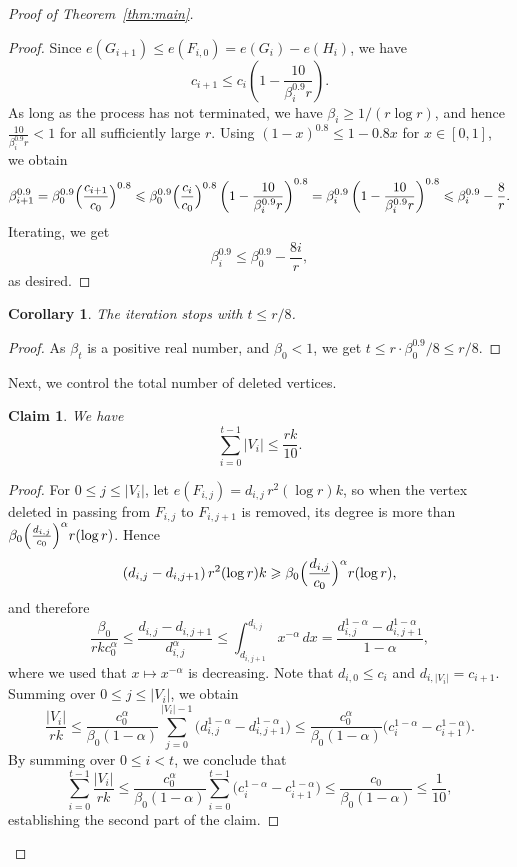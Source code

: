 \documentclass[12pt,reqno]{amsart}
\newtheorem{claim}[theorem]{Claim}
\newtheorem{corollary}[theorem]{Corollary}
\theoremstyle{remark}
\numberwithin{theorem}{section}
\renewcommand{\(}{\bigl(}
\renewcommand{\)}{\bigr)\vphantom{)}}
\renewcommand{\leq}{\le}
\renewcommand{\geq}{\ge}
\renewcommand{\le}{\leqslant}
\renewcommand{\ge}{\geqslant}
\begin{document}
\begin{proof}[Proof of Theorem~\ref{thm:main}]
\begin{proof}
    Since $e(G_{i+1})\leq e(F_{i,0})=e(G_i)-e(H_i)$, we have
\[c_{i+1}\leq c_i\left(1-\frac{10}{\beta_i^{0.9}r}\right).\]
As long as the process has not terminated, we have $\beta_i\geq 1/(r\log r)$, and hence $\frac{10}{\beta_i^{0.9}r} <1$ for all sufficiently large $r$. Using $(1-x)^{0.8}\leq 1-0.8x$ for $x\in[0,1]$, we obtain
\[\beta_{i+1}^{0.9}=
\beta_0^{0.9}\Bigl(\frac{c_{i+1}}{c_0}\Bigr)^{0.8} \leq
\beta_0^{0.9}\Bigl(\frac{c_i}{c_0}\Bigr)^{0.8}
\left(1-\frac{10}{\beta_i^{0.9}r}\right)^{0.8} =
\beta_i^{0.9}\left(1-\frac{10}{\beta_i^{0.9}r}\right)^{0.8}\leq
\beta_i^{0.9}-\frac{8}{r}.\]
Iterating, we get
\[\beta_i^{0.9}\leq \beta_0^{0.9}-\frac{8 i}{r},\]
as desired.
\end{proof}

\begin{corollary}
    The iteration stops with $t \leq r/8$.
\end{corollary}
\begin{proof}
    As $\beta_t$ is a positive real number, and $\beta_0<1$, we get $t\leq r\cdot\beta_0^{0.9}/8\leq r/8$.
\end{proof}

Next, we control the total number of deleted vertices.

\begin{claim}
   We have
    \[\sum_{i=0}^{t-1}|V_i|\leq \frac{rk}{10}.\]
\end{claim}

\begin{proof} 
 For $0\leq j\leq |V_i|$, let $e(F_{i,j})=d_{i,j}\,r^2(\log r)k$, so when the vertex deleted in passing from $F_{i,j}$ to $F_{i,j+1}$ is removed, its degree is more than $\beta_0\Bigl(\frac{d_{i,j}}{c_0}\Bigr)^\alpha r(\log r)$. Hence
\[(d_{i,j}-d_{i,j+1})\,r^2(\log r)k
\geq \beta_0\Bigl(\frac{d_{i,j}}{c_0}\Bigr)^\alpha r(\log r),\]
and therefore
\[\frac{\beta_0}{rkc_0^{\alpha}}
\leq \frac{d_{i,j}-d_{i,j+1}}{d_{i,j}^\alpha}\leq \int_{d_{i,j+1}}^{d_{i,j}}x^{-\alpha}\,dx
=\frac{d_{i,j}^{1-\alpha}-d_{i,j+1}^{1-\alpha}}{1-\alpha},\]
where we used that $x\mapsto x^{-\alpha}$ is decreasing. Note that $d_{i,0}
\leq c_i$ and $d_{i,|V_i|}=c_{i+1}$.
Summing over $0\leq j\leq |V_i|$, we obtain
\[\frac{|V_i|}{rk}
\leq \frac{c_0^\alpha}{\beta_0(1-\alpha)}
\sum_{j=0}^{|V_i|-1}\bigl(d_{i,j}^{1-\alpha}-d_{i,j+1}^{1-\alpha}\bigr)
\leq \frac{c_0^\alpha}{\beta_0(1-\alpha)}
\bigl(c_i^{1-\alpha}-c_{i+1}^{1-\alpha}\bigr).\]
By summing over $0\leq i<t$, we conclude that
\[\sum_{i=0}^{t-1}\frac{|V_i|}{rk}
\leq
\frac{c_0^\alpha}{\beta_0(1-\alpha)}
\sum_{i=0}^{t-1}\bigl(c_i^{1-\alpha}-c_{i+1}^{1-\alpha}\bigr)
\leq
\frac{c_0}{\beta_0(1-\alpha)}
\leq \frac1{10},\]
establishing the second part of the claim.    
\end{proof}


\end{proof}
\end{document}
